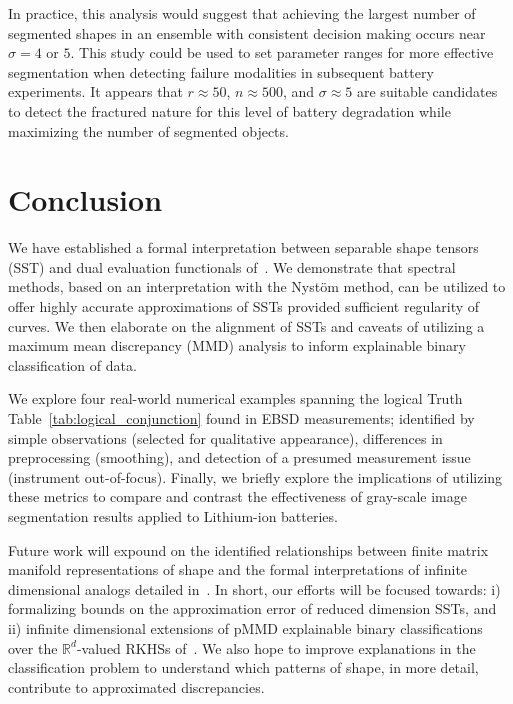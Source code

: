 \documentclass[pdflatex,iicol]{sn-jnl}%
\theoremstyle{thmstyleone}%
\theoremstyle{thmstyletwo}%
\theoremstyle{thmstylethree}%
\begin{document}
In practice, this analysis would suggest that achieving the largest number of segmented shapes in an ensemble with consistent decision making occurs near $\sigma = 4$ or $5$. This study could be used to set parameter ranges for more effective segmentation when detecting failure modalities in subsequent battery experiments. It appears that $r\approx 50$, $n\approx500$, and $\sigma \approx 5$ are suitable candidates to detect the fractured nature for this level of battery degradation while maximizing the number of segmented objects.

\section{Conclusion}\label{sec:conclude}
We have established a formal interpretation between separable shape tensors (SST) and dual evaluation functionals of~\cite{micheli2013matrix}. We demonstrate that spectral methods, based on an interpretation with the Nyst\"om method, can be utilized to offer highly accurate approximations of SSTs provided sufficient regularity of curves. We then elaborate on the alignment of SSTs and caveats of utilizing a maximum mean discrepancy (MMD) analysis to inform explainable binary classification of data.

We explore four real-world numerical examples spanning the logical Truth Table~\ref{tab:logical_conjunction} found in EBSD measurements; identified by simple observations (selected for qualitative appearance), differences in preprocessing (smoothing), and detection of a presumed measurement issue (instrument out-of-focus). Finally, we briefly explore the implications of utilizing these metrics to compare and contrast the effectiveness of gray-scale image segmentation results applied to Lithium-ion batteries.

Future work will expound on the identified relationships between finite matrix manifold representations of shape and the formal interpretations of infinite dimensional analogs detailed in~\cite{micheli2013matrix}. In short, our efforts will be focused towards: i) formalizing bounds on the approximation error of reduced dimension SSTs, and ii) infinite dimensional extensions of pMMD explainable binary classifications over the $\mathbb{R}^d$-valued RKHSs of~\cite{micheli2013matrix}. We also hope to improve explanations in the classification problem to understand which patterns of shape, in more detail, contribute to approximated discrepancies.

\backmatter
\end{document}

